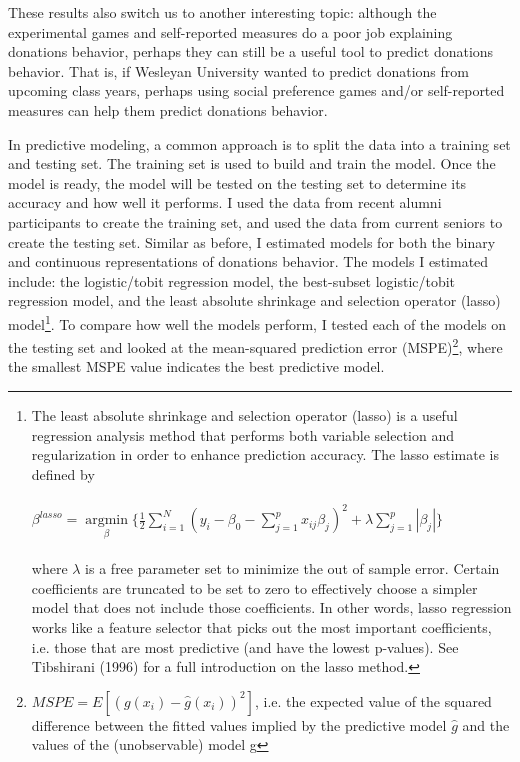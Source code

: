 \documentclass[12pt]{article}
\begin{document}
These results also switch us to another interesting topic: although the experimental games and self-reported measures do a poor job explaining donations behavior, perhaps they can still be a useful tool to predict donations behavior. That is, if Wesleyan University wanted to predict donations from upcoming class years, perhaps using social preference games and/or self-reported measures can help them predict donations behavior.

In predictive modeling, a common approach is to split the data into a training set and testing set. The training set is used to build and train the model. Once the model is ready, the model will be tested on the testing set to determine its accuracy and how well it performs. I used the data from recent alumni participants to create the training set, and used the data from current seniors to create the testing set. Similar as before, I estimated models for both the binary and continuous representations of donations behavior. The models I estimated include: the logistic/tobit regression model, the best-subset logistic/tobit regression model, and the least absolute shrinkage and selection operator (lasso) model\footnote{The least absolute shrinkage and selection operator (lasso) is a useful regression analysis method that performs both variable selection and regularization in order to enhance prediction accuracy. The lasso estimate is defined by\\ \\
\( \beta^{lasso}=\mathop\mathrm{argmin}\limits_{\beta} \{ \frac{1}{2} \sum_{i=1}^{N} (y_{i} - \beta_{0} - \sum_{j=1}^{p}x_{ij}\beta _{j})^{2}+\lambda\sum_{j=1}^{p}|\beta _{j}|\} \) \\ \\
where \(\lambda\) is a free parameter set to minimize the out of sample error. Certain coefficients are truncated to be set to zero to effectively choose a simpler model that does not include those coefficients. In other words, lasso regression works like a feature selector that picks out the most important coefficients, i.e. those that are most predictive (and have the lowest p-values). See Tibshirani (1996) for a full introduction on the lasso method.}. To compare how well the models perform, I tested each of the models on the testing set and looked at the mean-squared prediction error (MSPE)\footnote{\(MSPE = E[(g(x_{i}) - \hat{g}(x_{i}))^{2}]\), i.e. the expected value of the squared difference between the fitted values implied by the predictive model \(\hat{g}\) and the values of the (unobservable) model g}, where the smallest MSPE value indicates the best predictive model.
\end{document}
